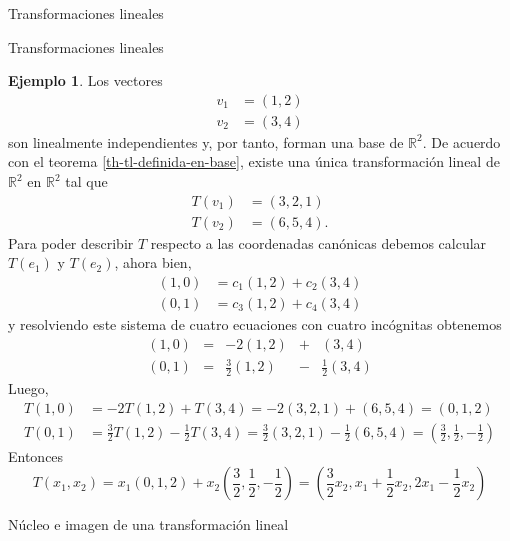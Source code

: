 \documentclass[a4paper,12pt,twoside,spanish,reqno]{amsbook}
\theoremstyle{definition}
\newtheorem{ejemplo}{Ejemplo}[section]
\theoremstyle{remark}
\newcommand{\R}{\mathbb R}
\begin{document}
\begin{chapter}{Transformaciones lineales}
\begin{section}{Transformaciones lineales}
		\begin{ejemplo}
			Los vectores
			\begin{align*}
				v_1 &= (1,2)\\
				v_2 &= (3,4)
			\end{align*}
			son linealmente independientes y, por tanto, forman una base de $\R^2$. De acuerdo con el teorema \ref{th-tl-definida-en-base}, existe una única transformación lineal de $\R^2$ en $\R^2$ tal que
			\begin{align*}
				T(v_1) &= (3,2, 1) \\
				T(v_2) &= (6, 5,4).
			\end{align*}
			Para poder describir $T$ respecto a las coordenadas canónicas debemos calcular $T(e_1)$ y $T(e_2)$,  ahora bien,
			\begin{align*}
			(1,0) &= c_{1}(1,2) + c_{2}(3,4)\\
			(0,1) &= c_{3}(1,2) + c_{4}(3,4)
			\end{align*}
			y resolviendo este sistema de cuatro ecuaciones con cuatro incógnitas obtenemos
			\begin{equation*}
			\begin{array}{rcrcr}
			(1,0) &=& -2(1,2) &+ &(3,4)\\
			(0,1) &=& \displaystyle\frac32(1,2) &- &\displaystyle\frac12(3,4)
			\end{array}
			\end{equation*}
			Luego, 
				\begin{align*}
			T(1,0) &= -2T(1,2)+ T(3,4) = -2(3,2, 1)+(6, 5,4) = (0,1,2)\\
			T(0,1) &= \displaystyle\frac32T(1,2) - \displaystyle\frac12T(3,4) = \displaystyle\frac32(3,2,1) - \displaystyle\frac12(6, 5,4)= (\displaystyle\frac32,\displaystyle\frac12,-\displaystyle\frac12)
			\end{align*}
			Entonces
				\begin{equation*}
			T(x_1,x_2) = x_1(0,1,2) + x_2		 (\displaystyle\frac32,\displaystyle\frac12,-\displaystyle\frac12)
			= (\displaystyle\frac32x_2,x_1+\displaystyle\frac12x_2,2x_1-\displaystyle\frac12x_2)
			\end{equation*}
		\end{ejemplo}
		
		\end{section}
	
	
		\begin{section}{Núcleo e imagen de una transformación lineal}
		

\end{section}
\end{chapter}
\end{document}
